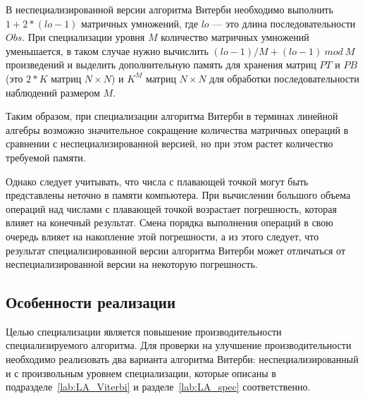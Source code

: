 В неспециализированной версии алгоритма Витерби необходимо 
выполнить $1 + 2 * (lo - 1)$ матричных умножений, где $lo$ 
--- это длина последовательности $Obs$.
При специализации уровня $M$ количество 
матричных умножений уменьшается, в таком случае нужно 
вычислить $\mathit{(lo - 1) / M + (lo - 1)\ mod\ M}$ 
произведений и выделить дополнительную память для хранения 
матриц $PT$ и $PB$ (это $2 * K$ матриц $N \times N$) и $K^{M}$ матриц $N 
\times N$ для обработки последовательности наблюдений 
размером $M$.

Таким образом, при специализации алгоритма Витерби в 
терминах линейной алгебры возможно значительное сокращение 
количества матричных операций в сравнении с 
неспециализированной версией, но при этом растет количество 
требуемой памяти.

Однако следует учитывать, что числа с плавающей точкой могут 
быть представлены неточно в памяти компьютера.
При вычислении большого объема операций над 
числами с плавающей точкой возрастает погрешность, которая 
влияет на конечный результат.
Смена порядка выполнения операций в свою очередь влияет на 
накопление этой погрешности, а из этого следует, что
результат специализированной версии алгоритма Витерби может 
отличаться от неспециализированной версии на некоторую 
погрешность.

\subsection{Особенности реализации}
Целью специализации является повышение производительности 
специализируемого алгоритма.
Для проверки на улучшение производительности необходимо 
реализовать два варианта алгоритма Витерби: 
неспециализированный и с произвольным уровнем специализации, 
которые описаны в подразделе~\ref{lab:LA_Viterbi} 
и разделе~\ref{lab:LA_spec} соответственно.

